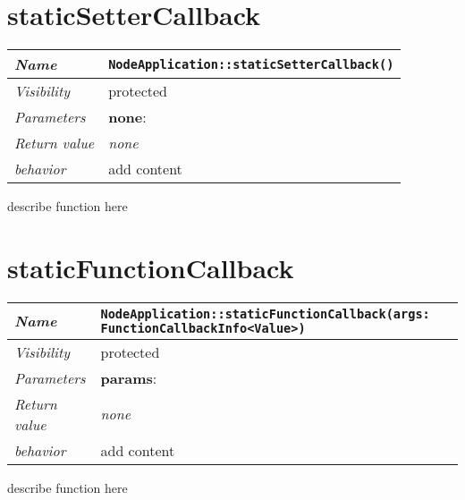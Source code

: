 \section{staticSetterCallback}
\begin{longtable}{p{3cm} @{\hskip 1cm} p{12cm}}
  \hline
  \textit{Name} & \texttt{NodeApplication::staticSetterCallback()} \\
  \hline
  \textit{Visibility} & protected \\
  \hline
  \textit{Parameters} & \textbf{none}: \\
  \hline
  \textit{Return value} & \textit{none} \\
  \hline
  \textit{behavior} & add content \\
  \hline
\end{longtable}
describe function here
\newpage

\section{staticFunctionCallback}
\begin{longtable}{p{3cm} @{\hskip 1cm} p{12cm}}
  \hline
  \textit{Name} & \texttt{NodeApplication::staticFunctionCallback(args: FunctionCallbackInfo<Value>)} \\
  \hline
  \textit{Visibility} & protected \\
  \hline
  \textit{Parameters} & \textbf{params}: \\
  \hline
  \textit{Return value} & \textit{none} \\
  \hline
  \textit{behavior} & add content \\
  \hline
\end{longtable}
describe function here
\newpage
